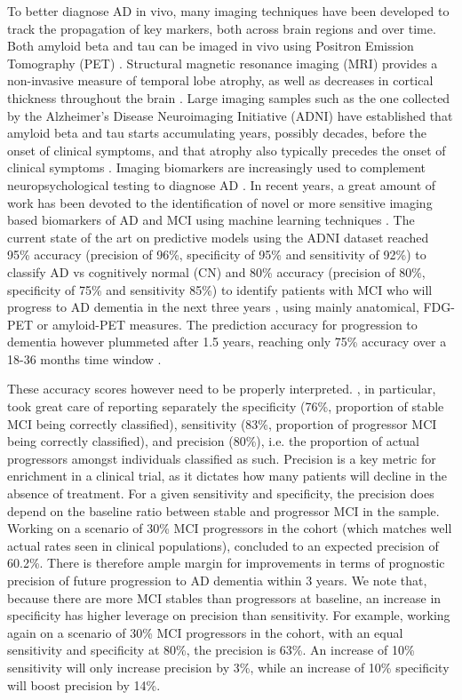 \documentclass[authoryear]{elsarticle}
\begin{document}
To better diagnose AD in vivo, many imaging techniques have been developed to track the propagation of key markers, both across brain regions and over time. Both amyloid beta and tau can be imaged in vivo using Positron Emission Tomography (PET) \citep{Fodero2011,Sperling2011}. Structural magnetic resonance imaging (MRI) provides a non-invasive measure of temporal lobe atrophy, as well as decreases in cortical thickness throughout the brain \citep{Lerch2005a}. Large imaging samples such as the one collected by the Alzheimer’s Disease Neuroimaging Initiative (ADNI) have established that amyloid beta and tau starts accumulating years, possibly decades, before the onset of clinical symptoms, and that atrophy also typically precedes the onset of clinical symptoms \citep{Mcconathy2015}. Imaging biomarkers are increasingly used to complement neuropsychological testing to diagnose AD \citep{Dubois2007}. In recent years, a great amount of work has been devoted to the identification of novel or more sensitive imaging based biomarkers of AD and MCI using machine learning techniques \citep{Rathore2017review}. The current state of the art on predictive models using the ADNI dataset reached 95\% accuracy (precision of 96\%, specificity of 95\% and sensitivity of 92\%) to classify AD vs cognitively normal (CN) \citep{Fan2008a,Zhu2014,Xu2015,Zu2016} and 80\% accuracy (precision of 80\%, specificity of 75\% and sensitivity 85\%) to identify patients with MCI who will progress to AD dementia in the next three years \citep{Toussaint2012,Moradi2015,Zheng2015,Cheng2015multimodal,Cheng2015domain,Korolev2016}, using mainly anatomical, FDG-PET or amyloid-PET measures. The prediction accuracy for progression to dementia however plummeted after 1.5 years, reaching only 75\% accuracy over a 18-36 months time window \citep{Korolev2016,Arbabshirani2017}. 

These accuracy scores however need to be properly interpreted. \cite{Korolev2016}, in particular, took great care of reporting separately the specificity (76\%, proportion of stable MCI being correctly classified), sensitivity (83\%, proportion of progressor MCI being correctly classified), and precision (80\%), i.e. the proportion of actual progressors amongst individuals classified as such. Precision is a key metric for enrichment in a clinical trial, as it dictates how many patients will decline in the absence of treatment. For a given sensitivity and specificity, the precision does depend on the baseline ratio between stable and progressor MCI in the sample. Working on a scenario of 30\% MCI progressors in the cohort (which matches well actual rates seen in clinical populations), \cite{Korolev2016} concluded to an expected precision of 60.2\%. There is therefore ample margin for improvements in terms of prognostic precision of future progression to AD dementia within 3 years. We note that, because there are more MCI stables than progressors at baseline, an increase in specificity has higher leverage on precision than sensitivity. For example, working again on a scenario of 30\% MCI progressors in the cohort, with an equal sensitivity and specificity at 80\%, the precision is 63\%. An increase of 10\% sensitivity will only increase precision by 3\%, while an increase of 10\% specificity will boost precision by 14\%. 
\end{document}
